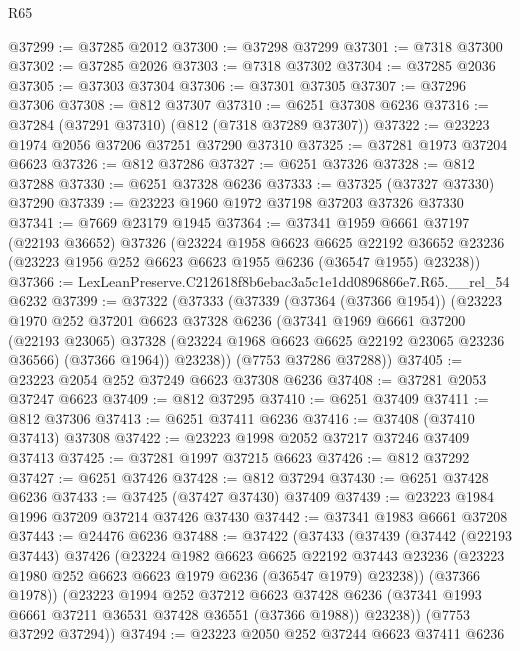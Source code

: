 \begin{lexlean}{R65}
\begin{coremodule}
{@37299 := @37285 @2012
@37300 := @37298 @37299
@37301 := @7318 @37300
@37302 := @37285 @2026
@37303 := @7318 @37302
@37304 := @37285 @2036
@37305 := @37303 @37304
@37306 := @37301 @37305
@37307 := @37296 @37306
@37308 := @812 @37307
@37310 := @6251 @37308 @6236
@37316 := @37284 (@37291 @37310) (@812 (@7318 @37289 @37307))
@37322 := @23223 @1974 @2056 @37206 @37251 @37290 @37310
@37325 := @37281 @1973 @37204 @6623
@37326 := @812 @37286
@37327 := @6251 @37326
@37328 := @812 @37288
@37330 := @6251 @37328 @6236
@37333 := @37325 (@37327 @37330) @37290
@37339 := @23223 @1960 @1972 @37198 @37203 @37326 @37330
@37341 := @7669 @23179 @1945
@37364 := @37341
    @1959
    @6661
    @37197
    (@22193 @36652)
    @37326
    (@23224
      @1958
      @6623
      @6625
      @22192
      @36652
      @23236
      (@23223 @1956 @252 @6623 @6623 @1955 @6236 (@36547 @1955) @23238))
@37366 := LexLeanPreserve.C212618f8b6ebac3a5c1e1dd0896866e7.R65.__rel_54 @6232
@37399 := @37322
    (@37333
      (@37339
        (@37364 (@37366 @1954))
        (@23223
          @1970
          @252
          @37201
          @6623
          @37328
          @6236
          (@37341
            @1969
            @6661
            @37200
            (@22193 @23065)
            @37328
            (@23224 @1968 @6623 @6625 @22192 @23065 @23236 @36566)
            (@37366 @1964))
          @23238))
      (@7753 @37286 @37288))
@37405 := @23223 @2054 @252 @37249 @6623 @37308 @6236
@37408 := @37281 @2053 @37247 @6623
@37409 := @812 @37295
@37410 := @6251 @37409
@37411 := @812 @37306
@37413 := @6251 @37411 @6236
@37416 := @37408 (@37410 @37413) @37308
@37422 := @23223 @1998 @2052 @37217 @37246 @37409 @37413
@37425 := @37281 @1997 @37215 @6623
@37426 := @812 @37292
@37427 := @6251 @37426
@37428 := @812 @37294
@37430 := @6251 @37428 @6236
@37433 := @37425 (@37427 @37430) @37409
@37439 := @23223 @1984 @1996 @37209 @37214 @37426 @37430
@37442 := @37341 @1983 @6661 @37208
@37443 := @24476 @6236
@37488 := @37422
    (@37433
      (@37439
        (@37442
          (@22193 @37443)
          @37426
          (@23224
            @1982
            @6623
            @6625
            @22192
            @37443
            @23236
            (@23223 @1980 @252 @6623 @6623 @1979 @6236 (@36547 @1979) @23238))
          (@37366 @1978))
        (@23223
          @1994
          @252
          @37212
          @6623
          @37428
          @6236
          (@37341 @1993 @6661 @37211 @36531 @37428 @36551 (@37366 @1988))
          @23238))
      (@7753 @37292 @37294))
@37494 := @23223 @2050 @252 @37244 @6623 @37411 @6236
}
\end{coremodule}
\end{lexlean}
